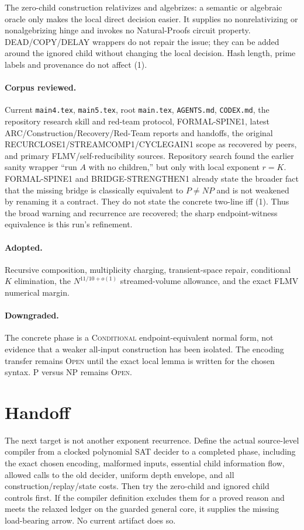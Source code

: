 \documentclass[11pt]{article}
\begin{document}
The zero-child construction relativizes and algebrizes: a semantic or
algebraic oracle only makes the local direct decision easier.  It supplies no
nonrelativizing or nonalgebrizing hinge and invokes no Natural-Proofs circuit
property.  DEAD/COPY/DELAY wrappers do not repair the issue; they can be added
around the ignored child without changing the local decision.  Hash length,
prime labels and provenance do not affect (1).

\paragraph{Corpus reviewed.}
Current \texttt{main4.tex}, \texttt{main5.tex}, root \texttt{main.tex},
\texttt{AGENTS.md}, \texttt{CODEX.md}, the repository research skill and
red-team protocol, FORMAL-SPINE1, latest ARC/Construction/Recovery/Red-Team
reports and handoffs, the original RECURCLOSE1/STREAMCOMP1/CYCLEGAIN1 scope as
recovered by peers, and primary FLMV/self-reducibility sources.  Repository
search found the earlier sanity wrapper ``run $A$ with no children,'' but only
with local exponent $r=K$.  FORMAL-SPINE1 and BRIDGE-STRENGTHEN1 already state
the broader fact that the missing bridge is classically equivalent to
$P\ne NP$ and is not weakened by renaming it a contract.  They do not state
the concrete two-line iff (1).  Thus the broad warning and recurrence are
recovered; the sharp endpoint-witness equivalence is this run's refinement.

\paragraph{Adopted.}
Recursive composition, multiplicity charging, transient-space repair,
conditional $K$ elimination, the $N^{11/10+o(1)}$ streamed-volume allowance,
and the exact FLMV numerical margin.

\paragraph{Downgraded.}
The concrete phase is a \textsc{Conditional} endpoint-equivalent normal form,
not evidence that a weaker all-input construction has been isolated.  The
encoding transfer remains \textsc{Open} until the exact local lemma is
written for the chosen syntax.  P versus NP remains \textsc{Open}.

\section{Handoff}

The next target is not another exponent recurrence.  Define the actual
source-level compiler from a clocked polynomial SAT decider to a completed
phase, including the exact chosen encoding, malformed inputs, essential child
information flow, allowed calls to the old decider, uniform depth envelope,
and all construction/replay/state costs.  Then try the zero-child and ignored
child controls first.  If the compiler definition excludes them for a proved
reason and meets the relaxed ledger on the guarded general core, it supplies
the missing load-bearing arrow.  No current artifact does so.

\end{document}

